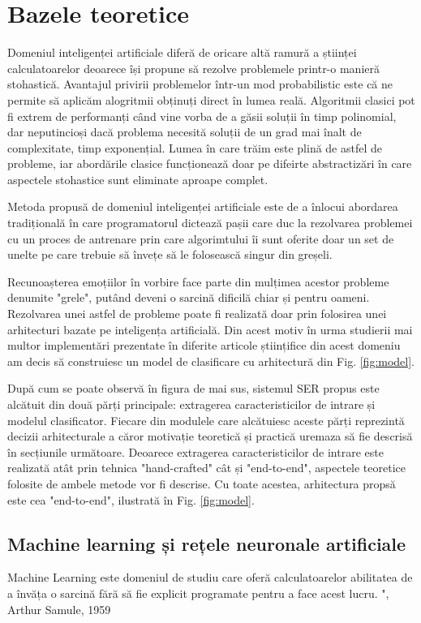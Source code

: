 \documentclass[a4paper,12pt]{book}
\begin{document}
			\chapter{Bazele teoretice}				 
				 Domeniul inteligenței artificiale diferă de oricare altă ramură a științei calculatoarelor deoarece își propune să rezolve problemele printr-o manieră stohastică. Avantajul privirii problemelor într-un mod probabilistic este că ne permite să aplicăm alogritmii obținuți direct în lumea reală. Algoritmii clasici pot fi extrem de performanți când vine vorba de a găsii soluții în timp polinomial, dar neputincioși dacă problema necesită soluții de un grad mai înalt de complexitate, timp exponențial. Lumea în care trăim este plină de astfel de probleme, iar abordările clasice funcționează doar pe difeirte abstractizări în care aspectele stohastice sunt eliminate aproape complet. \par				 
				 Metoda propusă de domeniul inteligenței artificiale este de a înlocui abordarea tradițională în care programatorul dictează pașii care duc la rezolvarea problemei cu un proces de antrenare prin care algorimtului îi sunt oferite doar un set de unelte pe care trebuie să învețe să le folosească singur din greșeli. \par			 
				 Recunoașterea emoțiilor în vorbire face parte din mulțimea acestor probleme denumite "grele", putând deveni o sarcină dificilă chiar și pentru oameni. Rezolvarea unei astfel de probleme poate fi realizată doar prin folosirea unei arhitecturi bazate pe inteligența artificială. Din acest motiv în urma studierii mai multor implementări prezentate în diferite articole științifice din acest domeniu am decis să construiesc un model de clasificare cu arhitectură din Fig. \ref{fig:model}. \par
				 După cum se poate observă în figura de mai sus, sistemul SER propus este alcătuit din două părți principale: extragerea caracteristicilor de intrare și modelul clasificator. Fiecare din modulele care alcătuiesc aceste părți reprezintă decizii arhitecturale a căror motivație teoretică și practică uremaza să fie descrisă în secțiunile următoare. Deoarece extragerea caracteristicilor de intrare este realizată atât prin tehnica "hand-crafted" cât și "end-to-end", aspectele teoretice folosite de ambele metode vor fi descrise. Cu toate acestea, arhitectura propsă este cea "end-to-end", ilustrată în Fig. \ref{fig:model}.
			\section{Machine learning și rețele neuronale artificiale} \label{ml}
			Machine Learning este domeniul de studiu care oferă calculatoarelor abilitatea de a învăța o sarcină fără să fie explicit programate pentru a face acest lucru. ", Arthur Samule, 1959 \cite{samuel}  \par
			
\end{document}
